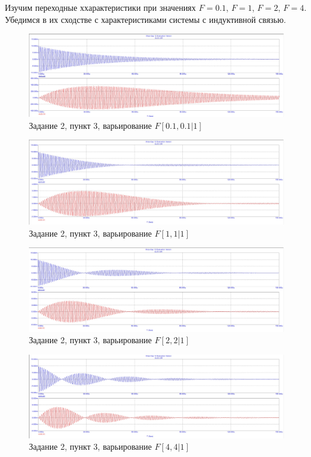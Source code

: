 \documentclass[a4paper, 14pt]{extarticle}%
\begin{document}
Изучим  переходные ххарактеристики при значениях $F = 0.1$,  $F = 1$,  $F = 2$,   $F = 4$. Убедимся в их сходстве с характеристиками системы с индуктивной связью. 

\begin{figure}[h!]
	\centering
			\includegraphics[width=1.1\linewidth]{2.3_varF1.jpg}
            \caption{Задание 2,  пункт 3, варьирование $F  [0.1, 0.1|1]$}
	\label{A}
\end{figure}


\begin{figure}[h!]
	\centering
			\includegraphics[width=1.1\linewidth]{2.3_varF2.jpg}
            \caption{Задание 2,  пункт 3, варьирование $F  [1, 1|1]$}
	\label{A}
\end{figure}

\begin{figure}[h!]
	\centering
			\includegraphics[width=1.1\linewidth]{2.3_varF3.jpg}
            \caption{Задание 2,  пункт 3, варьирование $F   [2, 2|1]$}
	\label{A}
\end{figure}


\begin{figure}[h!]
	\centering
			\includegraphics[width=1.1\linewidth]{2.3_varF4.jpg}
            \caption{Задание 2,  пункт 3, варьирование $F  [4, 4|1]$}
	\label{A}
\end{figure}
\end{document}

